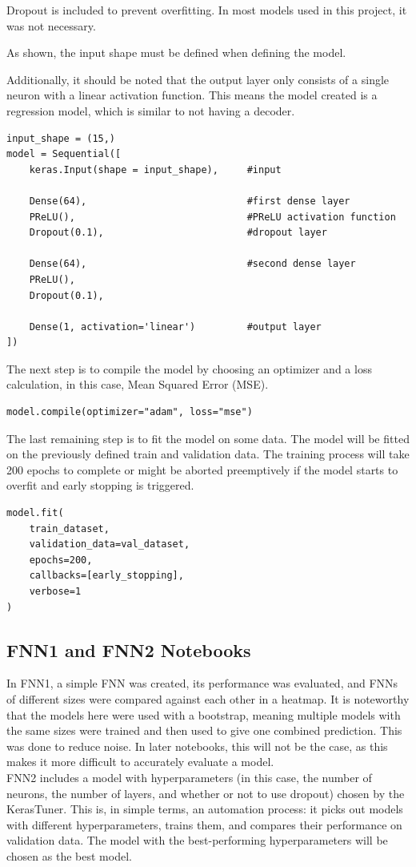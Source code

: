 \documentclass{article}
\begin{document}
Dropout is included to prevent overfitting. In most models used in this project, it was not necessary.

As shown, the input shape must be defined when defining the model.

Additionally, it should be noted that the output layer only consists of a single neuron with a linear activation function. This means the model created is a regression model, which is similar to not having a decoder.

\newpage
\begin{Verbatim}
input_shape = (15,)
model = Sequential([
    keras.Input(shape = input_shape),     #input

    Dense(64),                            #first dense layer
    PReLU(),                              #PReLU activation function
    Dropout(0.1),                         #dropout layer

    Dense(64),                            #second dense layer
    PReLU(),                                
    Dropout(0.1),                           

    Dense(1, activation='linear')         #output layer
])
\end{Verbatim}

The next step is to compile the model by choosing an optimizer and a loss calculation, in this case, Mean Squared Error (MSE).
\begin{Verbatim}
model.compile(optimizer="adam", loss="mse")
\end{Verbatim}

The last remaining step is to fit the model on some data. The model will be fitted on the previously defined train and validation data. The training process will take 200 epochs to complete or might be aborted preemptively if the model starts to overfit and early stopping is triggered.

\begin{Verbatim}
model.fit(
    train_dataset,
    validation_data=val_dataset,
    epochs=200,
    callbacks=[early_stopping],
    verbose=1
)
\end{Verbatim}

\subsection{FNN1 and FNN2 Notebooks}
In FNN1, a simple FNN was created, its performance was evaluated, and FNNs of different sizes were compared against each other in a heatmap. It is noteworthy that the models here were used with a bootstrap, meaning multiple models with the same sizes were trained and then used to give one combined prediction. This was done to reduce noise. In later notebooks, this will not be the case, as this makes it more difficult to accurately evaluate a model.
\\[2em]
FNN2 includes a model with hyperparameters (in this case, the number of neurons, the number of layers, and whether or not to use dropout) chosen by the KerasTuner. This is, in simple terms, an automation process: it picks out models with different hyperparameters, trains them, and compares their performance on validation data. The model with the best-performing hyperparameters will be chosen as the best model.
\end{document}
